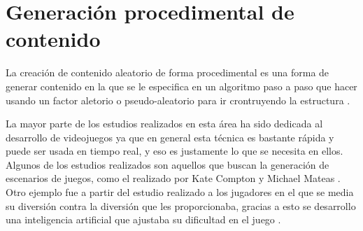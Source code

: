 \section{Generación procedimental de contenido} \label{sect:PCG}

La creación de contenido aleatorio de forma procedimental es una forma de generar
contenido en la que se le especifica en un algoritmo paso a paso que hacer 
usando un factor aletorio o pseudo-aleatorio para ir crontruyendo la estructura
\cite{PCG}.

La mayor parte de los estudios realizados en esta área ha sido dedicada al 
desarrollo de videojuegos ya que en general esta técnica es bastante rápida y
puede ser usada en tiempo real, y eso es justamente lo que se necesita en ellos.
Algunos de los estudios realizados son aquellos que buscan la generación de 
escenarios de juegos, como el realizado por Kate Compton y Michael Mateas 
\cite{CM06}. Otro ejemplo fue a partir del estudio realizado a los jugadores en
el que se media su diversión contra la diversión que les proporcionaba, gracias 
a esto se desarrollo una inteligencia artificial que ajustaba su dificultad en
el juego \cite{HC04}.
